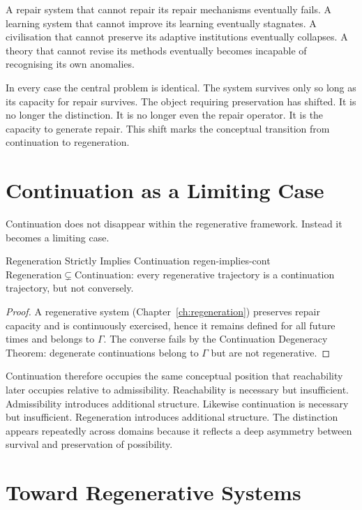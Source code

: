 \documentclass[12pt,twoside,openright]{book}
\newcounter{exercise}[chapter]
\begin{document}
A repair system that cannot repair its repair mechanisms
eventually fails. A learning system that cannot improve its
learning eventually stagnates. A civilisation that cannot
preserve its adaptive institutions eventually collapses. A
theory that cannot revise its methods eventually becomes
incapable of recognising its own anomalies.

In every case the central problem is identical. The system
survives only so long as its capacity for repair survives.
The object requiring preservation has shifted. It is no
longer the distinction. It is no longer even the repair
operator. It is the capacity to generate repair. This shift
marks the conceptual transition from continuation to
regeneration.

\section{Continuation as a Limiting Case}
\label{sec:ch10-limiting}

Continuation does not disappear within the regenerative
framework. Instead it becomes a limiting case.

\begin{proposition}{Regeneration Strictly Implies Continuation}%
  {regen-implies-cont}
  $\mathrm{Regeneration}\subsetneq\mathrm{Continuation}$:
  every regenerative trajectory is a continuation
  trajectory, but not conversely.
\end{proposition}

\begin{proof}
  A regenerative system (Chapter~\ref{ch:regeneration})
  preserves repair capacity and is continuously exercised,
  hence it remains defined for all future times and belongs
  to $\Gamma$. The converse fails by the Continuation
  Degeneracy Theorem: degenerate continuations belong to
  $\Gamma$ but are not regenerative.
\end{proof}

Continuation therefore occupies the same conceptual
position that reachability later occupies relative to
admissibility. Reachability is necessary but insufficient.
Admissibility introduces additional structure. Likewise
continuation is necessary but insufficient. Regeneration
introduces additional structure. The distinction appears
repeatedly across domains because it reflects a deep
asymmetry between survival and preservation of possibility.

\section{Toward Regenerative Systems}
\label{sec:ch10-toward}
\end{document}
